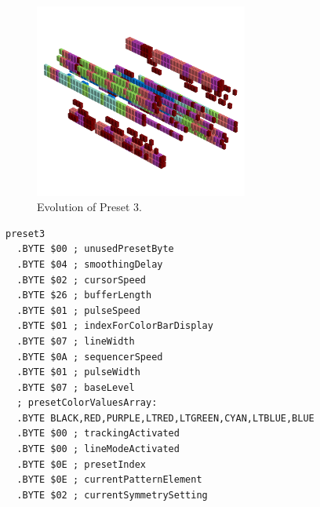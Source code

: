 \clearpage
\begin{minipage}[b]{0.48\linewidth}

\begin{figure}[H]                                                          
  \centering                                                             
  \begin{adjustbox}{width=7cm,center}                                   
  \includegraphics[width=7cm]{src/presets/pattern3-45.png}%
  \end{adjustbox}                                                        
\caption{Evolution of Preset 3.}                                           
\end{figure}                                                               
\end{minipage}
\hspace{0.1cm}
\begin{minipage}[b]{0.48\linewidth}                            
                                                                           
\begin{lstlisting}[basicstyle=\ttfamily\scriptsize,caption=Data structure for Preset 3.]
preset3
  .BYTE $00 ; unusedPresetByte
  .BYTE $04 ; smoothingDelay
  .BYTE $02 ; cursorSpeed
  .BYTE $26 ; bufferLength
  .BYTE $01 ; pulseSpeed
  .BYTE $01 ; indexForColorBarDisplay
  .BYTE $07 ; lineWidth
  .BYTE $0A ; sequencerSpeed
  .BYTE $01 ; pulseWidth
  .BYTE $07 ; baseLevel
  ; presetColorValuesArray: 
  .BYTE BLACK,RED,PURPLE,LTRED,LTGREEN,CYAN,LTBLUE,BLUE
  .BYTE $00 ; trackingActivated
  .BYTE $00 ; lineModeActivated
  .BYTE $0E ; presetIndex
  .BYTE $0E ; currentPatternElement
  .BYTE $02 ; currentSymmetrySetting
\end{lstlisting}

\end{minipage}
\vspace*{-0.7cm}
